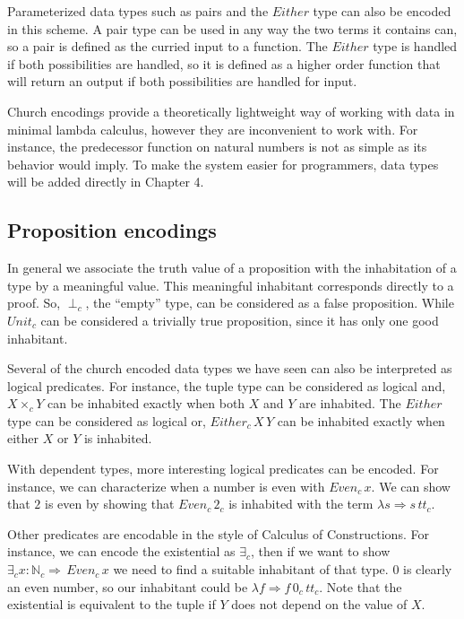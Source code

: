 Parameterized data types such as pairs and the $Either$ type can also be encoded in this scheme.
A pair type can be used in any way the two terms it contains can, so a pair is defined as the curried input to a function.
The $Either$ type is handled if both possibilities are handled, so it is defined as a higher order function that will return an output if both possibilities are handled for input.


Church encodings provide a theoretically lightweight way of working with data in minimal lambda calculus, however they are inconvenient to work with.
For instance, the predecessor function on natural numbers is not as simple as its behavior would imply.
To make the system easier for programmers, data types will be added directly in Chapter 4.

\subsection{Proposition encodings}

In general we associate the truth value of a proposition with the inhabitation of a type by a meaningful value.
This meaningful inhabitant corresponds directly to a proof.
So, $\perp_{c}$, the ``empty'' type, can be considered as a false proposition.
While $Unit_{c}$ can be considered a trivially true proposition, since it has only one good inhabitant.

Several of the church encoded data types we have seen can also be interpreted as logical predicates.
For instance, the tuple type can be considered as logical and, $X\times_{c}Y$ can be inhabited exactly when both $X$ and $Y$ are inhabited.
The $Either$ type can be considered as logical or, $Either_{c}\,X\,Y$ can be inhabited exactly when either $X$ or $Y$ is inhabited.

With dependent types, more interesting logical predicates can be encoded.
For instance, we can characterize when a number is even with $Even_{c}\,x$.
We can show that $2$ is even by showing that $Even_{c}\,2_{c}$ is inhabited with the term $\lambda s\Rightarrow s\,tt_{c}$.

Other predicates are encodable in the style of Calculus of Constructions\cite{10.1016/0890-5401(88)90005-3}.
For instance, we can encode the existential as $\exists_{c}$, then if we want to show $\exists_{c}x:\mathbb{N}_{c}\Rightarrow\,Even_{c}\,x$ we need to find a suitable inhabitant of that type.
$0$ is clearly an even number, so our inhabitant could be $\lambda f\Rightarrow f\,0_{c}\,tt_{c}$.
Note that the existential is equivalent to the tuple if $Y$ does not depend on the value of $X$.

